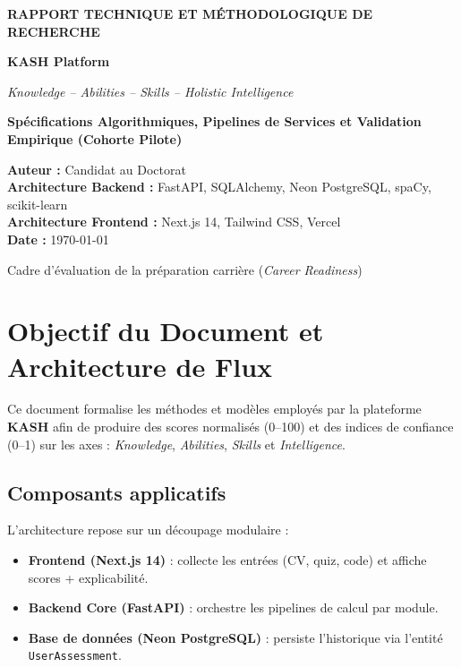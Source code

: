 \documentclass[11pt,a4paper]{article}
\begin{document}
\begin{titlepage}
    \centering
    \vspace*{1.5cm}
    {\LARGE\bfseries RAPPORT TECHNIQUE ET M\'ETHODOLOGIQUE DE RECHERCHE\par}
    \vspace{1cm}
    {\huge\bfseries KASH Platform\par}
    \vspace{0.4cm}
    {\Large\itshape Knowledge -- Abilities -- Skills -- Holistic Intelligence\par}
    \vspace{1.5cm}
    {\large\bfseries Sp\'ecifications Algorithmiques, Pipelines de Services et Validation Empirique (Cohorte Pilote)\par}
    \vspace{2.5cm}

    \begin{minipage}{0.85\textwidth}
        \centering
        \textbf{Auteur :} Candidat au Doctorat \\
        \textbf{Architecture Backend :} FastAPI, SQLAlchemy, Neon PostgreSQL, spaCy, scikit-learn \\
        \textbf{Architecture Frontend :} Next.js 14, Tailwind CSS, Vercel \\
        \textbf{Date :} \today
    \end{minipage}

    \vfill
    {\large Cadre d'\'evaluation de la pr\'eparation carri\`ere (\textit{Career Readiness})\par}
\end{titlepage}

\tableofcontents
\newpage

\section{Objectif du Document et Architecture de Flux}
Ce document formalise les m\'ethodes et mod\`eles employ\'es par la plateforme \textbf{KASH} afin de produire des scores normalis\'es (0--100) et des indices de confiance (0--1) sur les axes : \textit{Knowledge}, \textit{Abilities}, \textit{Skills} et \textit{Intelligence}.

\subsection{Composants applicatifs}
L'architecture repose sur un d\'ecoupage modulaire :
\begin{itemize}
    \item \textbf{Frontend (Next.js 14)} : collecte les entr\'ees (CV, quiz, code) et affiche scores + explicabilit\'e.
    \item \textbf{Backend Core (FastAPI)} : orchestre les pipelines de calcul par module.
    \item \textbf{Base de donn\'ees (Neon PostgreSQL)} : persiste l'historique via l'entit\'e \texttt{UserAssessment}.
\end{itemize}
\end{document}
